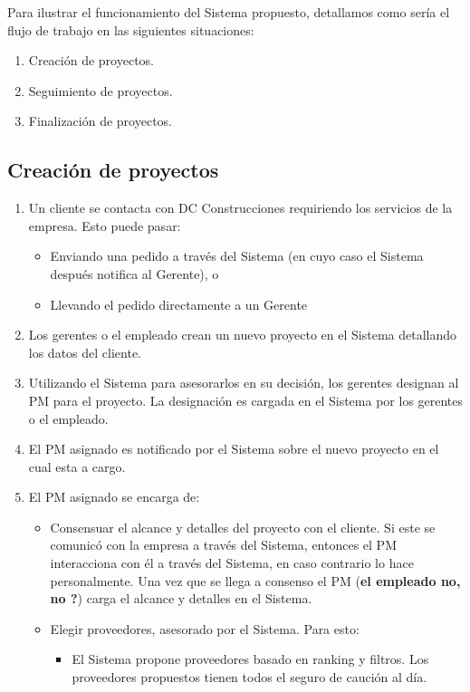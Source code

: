 Para ilustrar el funcionamiento del Sistema propuesto, detallamos como sería el flujo de trabajo en las siguientes situaciones:
\begin{enumerate}
    \item Creación de proyectos.
    \item Seguimiento de proyectos.
    \item Finalización de proyectos.
\end{enumerate}

\subsection{Creación de proyectos}

\begin{enumerate}
    \item Un cliente se contacta con DC Construcciones requiriendo los servicios de la empresa. Esto puede pasar:
        \begin{itemize}
            \item Enviando una pedido a través del Sistema (en cuyo caso el Sistema después notifica al Gerente), o
            \item Llevando el pedido directamente a un Gerente
        \end{itemize}
    \item Los gerentes o el empleado crean un nuevo proyecto en el Sistema detallando los datos del cliente.
    \item Utilizando el Sistema para asesorarlos en su decisión, los gerentes designan al PM para el proyecto.
        La designación es cargada en el Sistema por los gerentes o el empleado.
    \item El PM asignado es notificado por el Sistema sobre el nuevo proyecto en el cual esta a cargo.
    \item El PM asignado se encarga de:
        \begin{itemize}
            \item Consensuar el alcance y detalles del proyecto con el cliente. Si este se comunicó con la empresa a través del Sistema, entonces el PM interacciona con él a través del Sistema, en caso contrario lo hace personalmente. Una vez que se llega a consenso el PM (\textbf{el empleado no, no ?}) carga el alcance y detalles en el Sistema.
            \item Elegir proveedores, asesorado por el Sistema. Para esto:
                \begin{itemize}
                    \item El Sistema propone proveedores basado en ranking y filtros. Los proveedores propuestos tienen todos el seguro de caución al día.

\end{itemize}
\end{itemize}
\end{enumerate}
